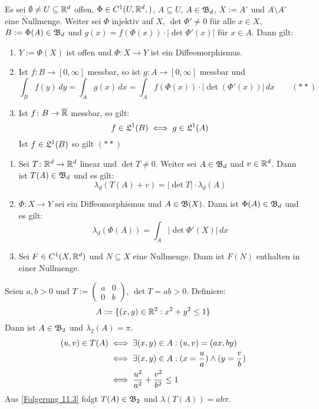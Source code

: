\documentclass[a4paper,twoside,DIV15,BCOR12mm,chapterprefix=true,headings=onelinechapter]{scrbook}
\begin{document}
\begin{satz}
\label{Satz 11.2}
Es sei $\emptyset \neq U \subseteq \mathbb{R}^d$ offen, $\Phi \in C^1(U, \mathbb{R}^d,)$, $A \subseteq U$, $A \in \mathfrak{B}_d$,
$X := A^{\circ}$ und $A \setminus A^{\circ}$ eine Nullmenge.
Weiter sei $\Phi$ injektiv auf $X$, $\det\Phi' \neq 0$ für alle $x \in X$, $B:=\Phi(A) \in \mathfrak{B}_d$ und
$g(x) = f(\Phi(x)) \cdot \lvert\det\Phi'(x)\rvert$ für $x \in A$.
Dann gilt:
\begin{enumerate}
\item	$Y := \Phi(X)$ ist offen und $\Phi: X\to Y$ ist ein Diffeomorphismus.
\item	Ist $f\colon B \to [0, \infty]$ messbar, so ist $g\colon A \to [0, \infty]$ messbar und
\[ \int_B f(y) \, dy = \int_A g(x) \, dx= \int_A f(\Phi(x)) \cdot\lvert\det(\Phi'(x))\rvert \, dx \qquad (\ast\ast)\]
\item	Ist $f\colon B \to \overline{\mathbb{R}}$ messbar, so gilt:\\
\[ f \in \mathfrak{L}^{1}(B) \iff g \in \mathfrak{L}^{1}(A) \]
Ist $f \in \mathfrak{L}^{1}(B)$ so gilt $(\ast\ast)$
\end{enumerate}
\end{satz}

\begin{folgerungen}
\label{Folgerung 11.3}
\begin{enumerate}
\item	Sei $T\colon \mathbb{R}^d \to \mathbb{R}^d$ linear und $\det T \neq 0$. Weiter sei $A \in \mathfrak{B}_d$ und $v \in \mathbb{R}^d$.
Dann ist $T(A) \in \mathfrak{B}_d$ und es gilt:
\[\lambda_d(T(A)+v) = \lvert\det T\rvert \cdot\lambda_d(A)\]
\item	$\Phi\colon X \to Y$ sei ein Diffeomorphismus und $A \in \mathfrak{B}(X)$. 
Dann ist $\Phi(A) \in \mathfrak{B}_d$ und es gilt:
\[\lambda_d(\Phi(A)) = \int_A |\det \Phi'(X)| \, dx\]
\item	Sei $F \in C^1(X, \mathbb{R}^d)$ und $N \subseteq X$ eine Nullmenge.
Dann ist $F(N)$ enthalten in einer Nullmenge.
\end{enumerate}
\end{folgerungen}

\begin{beispiel}
Seien $a,b > 0$ und $T:=\begin{pmatrix} a &  0 \\ 0 & b \end{pmatrix}$, $\det T = a b > 0$. Definiere:
\[A:=\{(x,y)\in \mathbb{R}^2: x^2 + y^2 \leq 1\}\]
Dann ist $A \in \mathfrak{B}_2$ und $\lambda_2(A) = \pi$.
\begin{align*}
(u,v) \in T(A) &\iff \exists (x,y)\in A: (u,v) = (a x, b y)\\
&\iff \exists (x,y) \in A: (x = \frac{u}{a})\wedge (y = \frac{v}{b})\\
&\iff \frac{u^2}{a^2} + \frac{v^2}{b^2} \leq 1
\end{align*}
Aus \ref{Folgerung 11.3} folgt $T(A) \in \mathfrak{B}_2$ und $\lambda(T(A)) = a b \pi$.
\end{beispiel}
\end{document}
